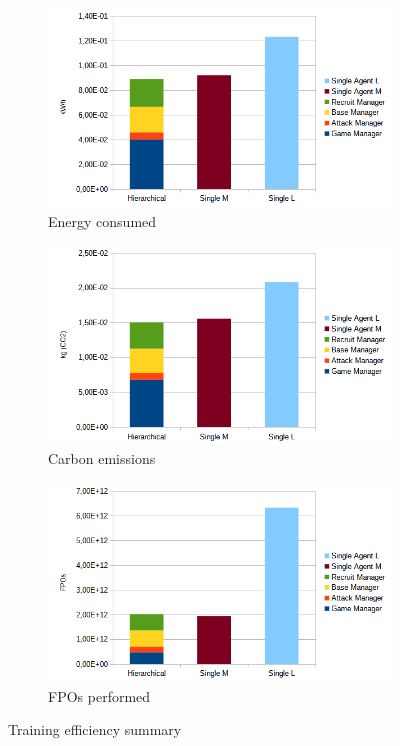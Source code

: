 \begin{figure}[t]
    \centering
    \begin{subfigure}[b]{0.48\textwidth}
        \includegraphics[width=1\textwidth]{figs/training_energy.png}
        \caption{Energy consumed}
    \end{subfigure}
    \hfill
    \begin{subfigure}[b]{0.48\textwidth}
        \includegraphics[width=1\textwidth]{figs/training_emissions.png}
        \caption{Carbon emissions}
    \end{subfigure}
    \hfill
    \begin{subfigure}[b]{0.48\textwidth}
        \includegraphics[width=1\textwidth]{figs/training_fpos.png}
        \caption{FPOs performed}
    \end{subfigure}
    \caption{Training efficiency summary}
    \label{fig:results}
\end{figure}

